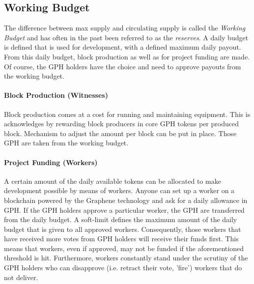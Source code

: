 \subsection{ Working Budget }
The difference between max supply and circulating supply is called the \emph{Working Budget} and has often in the past been referred to as the \emph{reserves}.
A daily budget is defined that is used for development, with a defined maximum daily payout.
From this daily budget, block production as well as for project funding are made. Of course, the GPH holders have the choice and need to approve payouts from the working budget.

\paragraph{Block Production (Witnesses) }
Block production comes at a cost for running and maintaining equipment. This is acknowledges by rewarding block 
producers in core GPH tokens per produced block. Mechanism to adjust the amount per block can be put in place. Those GPH are taken from the working budget.

\paragraph{Project Funding (Workers) }
A certain amount of the daily available tokens can be allocated to make development possible by means of workers. Anyone can set up a worker 
on a blockchain powered by the Graphene technology and ask for a daily allowance in GPH. If the GPH holders approve a particular worker, the GPH are transferred from the 
daily budget. A soft-limit defines the maximum amount of the daily budget that is given to all approved workers. Consequently, those workers 
that have received more votes from GPH holders will receive their funds first. This means that workers, even if approved, may not be funded if 
the aforementioned threshold is hit. Furthermore, workers constantly stand under the scrutiny of the GPH holders who can disapprove (i.e. retract their vote, 'fire') 
workers that do not deliver.